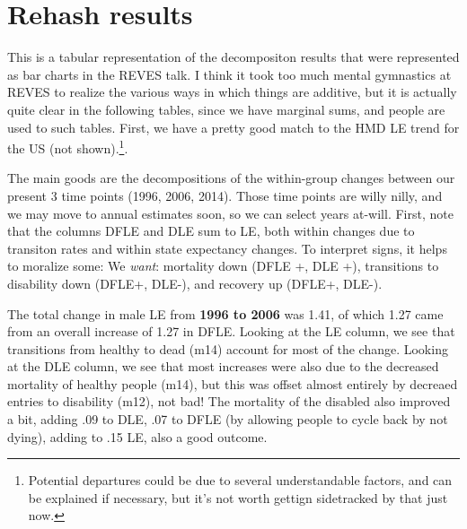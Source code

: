 \section{Rehash results}
This is a tabular representation of the decompositon results that were represented as bar charts in the REVES talk. I think it took too much mental gymnastics at REVES to realize the various ways in which things are additive, but it is actually quite clear in the following tables, since we have marginal sums, and people are used to such tables. First, we have a pretty good match to the HMD LE trend for the US (not shown).\footnote{Potential departures could be due to several understandable factors, and can be explained if necessary, but it's not worth gettign sidetracked by that just now.}. 

The main goods are the decompositions of the within-group changes between our present 3 time points (1996, 2006, 2014). Those time points are willy nilly, and we may move to annual estimates soon, so we can select years at-will. First, note that the columns DFLE and DLE sum to LE, both within changes due to transiton rates and within state expectancy changes. To interpret signs, it helps to moralize some: We \emph{want}: mortality down (DFLE +, DLE +), transitions to disability down (DFLE+, DLE-), and recovery up (DFLE+, DLE-).

The total change in male LE from \textbf{1996 to 2006} was 1.41, of which 1.27 came from an overall increase of 1.27 in DFLE. Looking at the LE column, we see that transitions from healthy to dead (m14) account for most of the change. Looking at the DLE column, we see that most increases were also due to the decreased mortality of healthy people (m14), but this was offset almost entirely by decreaed entries to disability (m12), not bad! The mortality of the disabled also improved a bit, adding .09 to DLE, .07 to DFLE (by allowing people to cycle back by not dying), adding to .15 LE, also a good outcome.

